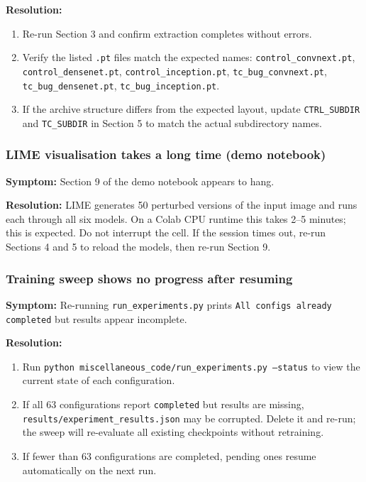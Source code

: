 \documentclass[12pt,a4paper]{article}
\begin{document}
\textbf{Resolution:}
\begin{enumerate}
    \item Re-run Section 3 and confirm extraction completes without errors.
    \item Verify the listed \texttt{.pt} files match the expected names:
          \texttt{control\_convnext.pt}, \texttt{control\_densenet.pt},
          \texttt{control\_inception.pt}, \texttt{tc\_bug\_convnext.pt},
          \texttt{tc\_bug\_densenet.pt}, \texttt{tc\_bug\_inception.pt}.
    \item If the archive structure differs from the expected layout, update
          \texttt{CTRL\_SUBDIR} and \texttt{TC\_SUBDIR} in Section 5 to
          match the actual subdirectory names.
\end{enumerate}

\subsubsection{LIME visualisation takes a long time (demo notebook)}

\textbf{Symptom:} Section 9 of the demo notebook appears to hang.

\textbf{Resolution:}
LIME generates 50 perturbed versions of the input image and runs each
through all six models. On a Colab CPU runtime this takes 2--5 minutes;
this is expected. Do not interrupt the cell. If the session times out,
re-run Sections 4 and 5 to reload the models, then re-run Section 9.

\subsubsection{Training sweep shows no progress after resuming}

\textbf{Symptom:} Re-running \texttt{run\_experiments.py} prints
\texttt{All configs already completed} but results appear incomplete.

\textbf{Resolution:}
\begin{enumerate}
    \item Run \texttt{python miscellaneous\_code/run\_experiments.py
          --status} to view the current state of each configuration.
    \item If all 63 configurations report \texttt{completed} but results
          are missing, \texttt{results/experiment\_results.json} may be
          corrupted. Delete it and re-run; the sweep will re-evaluate all
          existing checkpoints without retraining.
    \item If fewer than 63 configurations are completed, pending ones
          resume automatically on the next run.
\end{enumerate}
\end{document}
